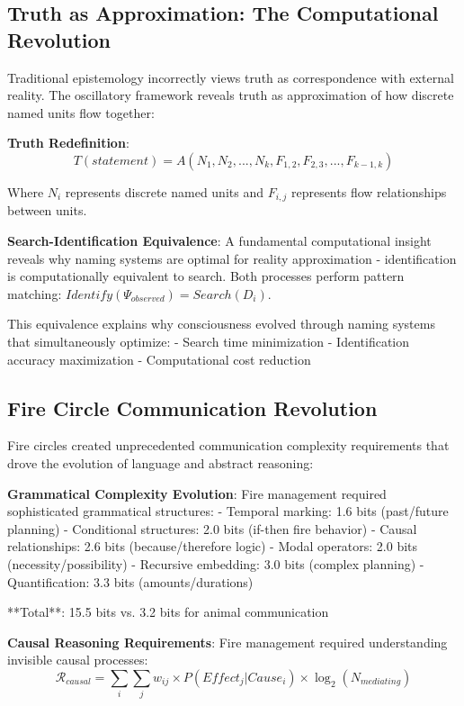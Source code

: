 \documentclass[12pt]{article}
\begin{document}
\subsection{Truth as Approximation: The Computational Revolution}

Traditional epistemology incorrectly views truth as correspondence with external reality. The oscillatory framework reveals truth as approximation of how discrete named units flow together:

\textbf{Truth Redefinition}:
$$T(statement) = A(N_1, N_2, ..., N_k, F_{1,2}, F_{2,3}, ..., F_{k-1,k})$$

Where $N_i$ represents discrete named units and $F_{i,j}$ represents flow relationships between units.

\textbf{Search-Identification Equivalence}: A fundamental computational insight reveals why naming systems are optimal for reality approximation - identification is computationally equivalent to search. Both processes perform pattern matching: $Identify(\Psi_{observed}) = Search(D_i)$.

This equivalence explains why consciousness evolved through naming systems that simultaneously optimize:
- Search time minimization
- Identification accuracy maximization
- Computational cost reduction

\subsection{Fire Circle Communication Revolution}

Fire circles created unprecedented communication complexity requirements that drove the evolution of language and abstract reasoning:

\textbf{Grammatical Complexity Evolution}: Fire management required sophisticated grammatical structures:
- Temporal marking: 1.6 bits (past/future planning)
- Conditional structures: 2.0 bits (if-then fire behavior)
- Causal relationships: 2.6 bits (because/therefore logic)
- Modal operators: 2.0 bits (necessity/possibility)
- Recursive embedding: 3.0 bits (complex planning)
- Quantification: 3.3 bits (amounts/durations)

**Total**: 15.5 bits vs. 3.2 bits for animal communication

\textbf{Causal Reasoning Requirements}: Fire management required understanding invisible causal processes:
$$\mathcal{R}_{causal} = \sum_{i} \sum_{j} w_{ij} \times P(Effect_j | Cause_i) \times \log_2(N_{mediating})$$
\end{document}
